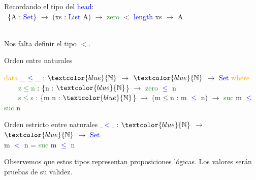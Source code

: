 \documentclass[xcolor=dvipsnames]{beamer} %
\newcommand{\cf}[1]{\textcolor{blue}{#1}}
\newcommand{\ct}[1]{\textcolor{blue}{#1}}
\newcommand{\cc}[1]{\textcolor{ForestGreen}{#1}}
\newcommand{\ck}[1]{\textcolor{orange}{#1}}
\newcommand{\N}{\ct{\mathbb{N}}}
\newcommand{\ra}{\rightarrow}
\begin{document}
\begin{frame}
\begin{block}{}
Recordando el tipo del \cf{head}:\\

\
\{A : \ct{Set}\} $\ra$ 
(xs : \ct{List} A) $\ra$ \cc{zero} $<$ \cf{length} xs $\ra$ A\\

\

Nos falta definir el tipo $<$.
\end{block}

\pause

\begin{block}{Orden entre naturales}

\ck{data} \ct{\_$\leq$\_} : $\N$ $\ra$ $\N$ $\ra$ \ct{Set} \ck{where}\\
\ \ \ \ \cc{z$\leq$n} : \{n : $\N$\}                 $\ra$ \cc{zero}  \ct{$\leq$} n\\
\ \ \ \ \cc{s$\leq$s} : \{m n : $\N$\} $\ra$ (m$\leq$n : m \ct{$\leq$} n) $\ra$ \cc{suc} m \ct{$\leq$} \cc{suc} n

\end{block}

\pause

\begin{block}{Orden estricto entre naturales}
\cf{$\_<\_$} : $\N$ $\ra$ $\N$ $\ra$ \ct{Set}\\
m \cf{$<$} n = \cc{suc} m \cf{$\leq$} n
\end{block}

\pause

\begin{block}{}
 Observemos que estos tipos representan proposiciones lógicas. Los valores serán pruebas de su validez.
\end{block}


\end{frame}
\end{document}
